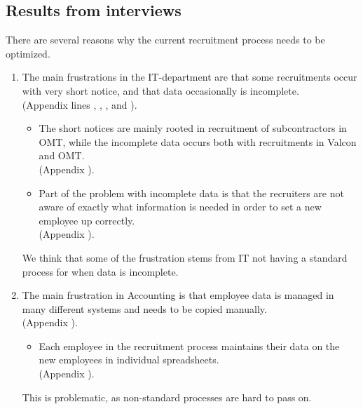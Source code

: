 \subsection{Results from interviews}
There are several reasons why the current recruitment process needs to be optimized.

\begin{enumerate}
\item The main frustrations in the IT-department are that some recruitments occur with very short notice, and that data occasionally is incomplete.\\
(Appendix  lines , , , and ).
\begin{itemize}
\item The short notices are mainly rooted in recruitment of subcontractors in OMT, while the incomplete data occurs both with recruitments in Valcon and OMT.\\
(Appendix ).
\item Part of the problem with incomplete data is that the recruiters are not aware of exactly what information is needed in order to set a new employee up correctly.\\
(Appendix ).
\end{itemize}

We think that some of the frustration stems from IT not having a standard process for when data is incomplete.

\item The main frustration in Accounting is that employee data is managed in many different systems and needs to be copied manually.\\
(Appendix ).
\begin{itemize}
\item Each employee in the recruitment process maintains their data on the new employees in individual spreadsheets.\\
(Appendix ).
\end{itemize}

This is problematic, as non-standard processes are hard to pass on.


\end{enumerate}
